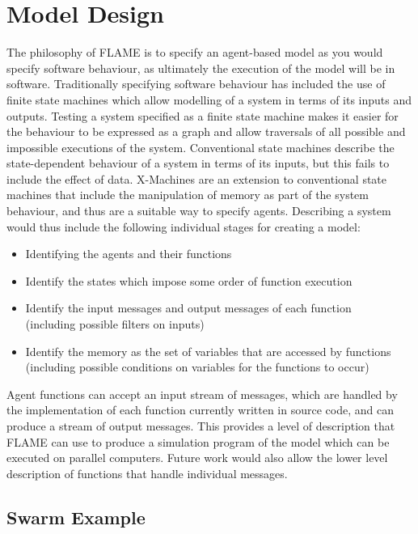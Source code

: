\section{Model Design}
\label{model_design}

The philosophy of FLAME is to specify an agent-based model as you would specify
software behaviour, as ultimately the execution of the model will be in software.
Traditionally specifying software behaviour has included the use of finite state
machines which allow modelling of a system in terms of its inputs and outputs. Testing a system
specified as a finite state machine makes it easier for the behaviour to be
expressed as a graph and allow traversals of all possible and impossible
executions of the system. Conventional state machines describe the
state-dependent behaviour of a system in terms of its inputs, but this fails to
include the effect of data. X-Machines are an extension to conventional state
machines that include the manipulation of memory as part of the system behaviour,
and thus are a suitable way to specify agents. Describing a system would thus
include the following individual stages for creating a model:

\begin{itemize}
\item Identifying the agents and their functions
\item Identify the states which impose some order of function execution
\item Identify the input messages and output messages of each function 
\\(including possible filters on inputs)
\item Identify the memory as the set of variables that are accessed by
functions \\(including possible conditions on variables for the functions to
occur)
\end{itemize}

Agent functions can accept an input stream of messages, which are handled by the
implementation of each function currently written in source code, and can
produce a stream of output messages. This provides a level of description that
FLAME can use to produce a simulation program of the model which can be
executed on parallel computers. Future work would also allow the
lower level description of functions that handle individual messages.

\subsection{Swarm Example}

